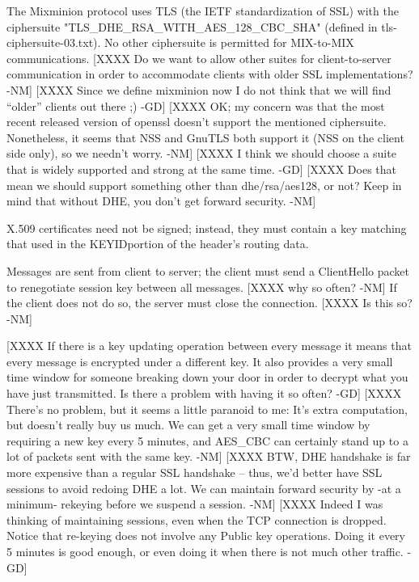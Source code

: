 The Mixminion protocol uses TLS (the IETF standardization of SSL) with
the ciphersuite "TLS_DHE_RSA_WITH_AES_128_CBC_SHA" (defined in
tls-ciphersuite-03.txt).  No other ciphersuite is permitted for
MIX-to-MIX communications.
[XXXX Do we want to allow other suites for client-to-server
      communication in order to accommodate clients with older SSL
      implementations? -NM]
[XXXX Since we define mixminion now I do not think that we will find
      ``older'' clients out there ;) -GD]
[XXXX OK; my concern was that the most recent released version of
      openssl doesn't support the mentioned ciphersuite.  Nonetheless,
      it seems that NSS and GnuTLS both support it (NSS on the client
      side only), so we needn't worry. -NM]  
[XXXX I think we should choose a suite that is widely supported and
      strong at the same time. -GD]
[XXXX Does that mean we should support something other than
      dhe/rsa/aes128, or not?  Keep in mind that without DHE, you
      don't get forward security. -NM]

X.509 certificates need not be signed; instead, they must contain
a key matching that used in the KEYIDportion of the header's routing
data.  

Messages are sent from client to server; the client must send a
ClientHello packet to renegotiate session key between all
messages. [XXXX why so often? -NM] If the client does not do so, the
server must close the connection.  [XXXX Is this so? -NM]

[XXXX If there is a key updating operation between every message it means
that every message is encrypted under a different key. It also
provides a very small time window for someone breaking down your door
in order to decrypt what you have just transmitted. Is there a problem
with having it so often? -GD]
[XXXX There's no problem, but it seems a little paranoid to me: It's
extra computation, but doesn't really buy us much.  We can get a very
small time window by requiring a new key every 5 minutes, and AES_CBC
can certainly stand up to a lot of packets sent with the same
key. -NM]
[XXXX BTW, DHE handshake is far more expensive than a regular SSL
handshake -- thus, we'd better have SSL sessions to avoid redoing DHE
a lot.  We can maintain forward security by -at a minimum- rekeying
before we suspend a session. -NM]
[XXXX Indeed I was thinking of maintaining sessions, even when the TCP
connection is dropped. Notice that re-keying does not involve any
Public key operations. Doing it every 5 minutes is good enough, or
even doing it when there is not much other traffic. -GD]

